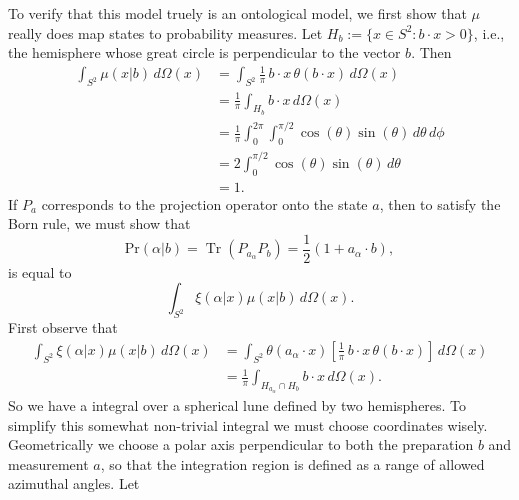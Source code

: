 \documentclass[12pt,draft]{article}
\DeclareMathOperator{\Tr}{Tr}
\theoremstyle{definition}
\theoremstyle{plain}
\begin{document}
{        To verify that this model truely is an ontological
        model, we first show that $\mu$ really does map
        states to probability measures. Let $H_b := \{x \in
        S^2 : b \cdot x > 0\}$, i.e., the hemisphere whose
        great circle is perpendicular to the vector $b$.
        Then
        \begin{align}
            \int_{S^2} \mu(x | b) \, d\Omega(x)
            &= \int_{S^2} \frac{1}{\pi} \, b \cdot x \,
            \theta(b \cdot x) \, d\Omega(x) \\
            &= \frac{1}{\pi} \int_{H_b} b \cdot x \,
            d\Omega(x) \\
            &= \frac{1}{\pi}
            \int_0^{2\pi} \int_{0}^{\pi / 2}
            \cos(\theta) \sin(\theta) \, d\theta \, d\phi \\
            &= 2 \int_0^{\pi / 2} \cos(\theta) \sin(\theta)
            \, d\theta \\
            &= 1.
        \end{align}
        If $P_a$ corresponds to the projection operator onto
        the state $a$, then to satisfy the Born rule, we
        must show that
        \begin{equation}
            \text{Pr}(\alpha | b)
            = \Tr(P_{a_\alpha} P_b)
            = \frac{1}{2} \left(
                1 + a_\alpha \cdot b
            \right), 
        \end{equation}
        is equal to
        \begin{equation}
            \int_{S^2} \xi(\alpha | x) \mu(x | b) \,
            d\Omega(x).
        \end{equation}
        First observe that
        \begin{align}
            \int_{S^2} \xi(\alpha | x) \mu(x | b) \,
            d\Omega(x)
            &= \int_{S^2} \theta(a_\alpha \cdot x) \left[
                \frac{1}{\pi} \, b \cdot x \, \theta(b \cdot
                x) 
            \right] \, d\Omega(x) \\
            &= \frac{1}{\pi} \int_{H_{a_\alpha} \cap H_b}
            b \cdot x \, d\Omega(x).
        \end{align}
        So we have a integral over a spherical lune defined
        by two hemispheres. To simplify this somewhat
        non-trivial integral we must choose coordinates
        wisely.  Geometrically we choose a polar axis
        perpendicular to both the preparation $b$ and
        measurement $a$, so that the integration region is
        defined as a range of allowed azimuthal angles. Let
}
\end{document}
